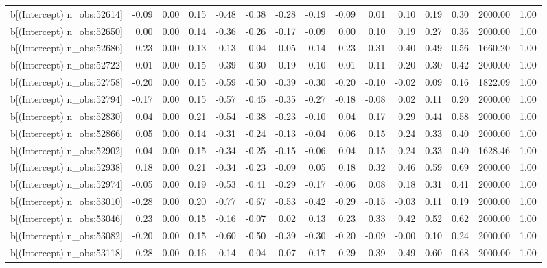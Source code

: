 \begin{table}[ht]
\begin{tabular}{rrrrrrrrrrrrrrr}
  b[(Intercept) n\_obs:52614] & -0.09 & 0.00 & 0.15 & -0.48 & -0.38 & -0.28 & -0.19 & -0.09 & 0.01 & 0.10 & 0.19 & 0.30 & 2000.00 & 1.00 \\ 
  b[(Intercept) n\_obs:52650] & 0.00 & 0.00 & 0.14 & -0.36 & -0.26 & -0.17 & -0.09 & 0.00 & 0.10 & 0.19 & 0.27 & 0.36 & 2000.00 & 1.00 \\ 
  b[(Intercept) n\_obs:52686] & 0.23 & 0.00 & 0.13 & -0.13 & -0.04 & 0.05 & 0.14 & 0.23 & 0.31 & 0.40 & 0.49 & 0.56 & 1660.20 & 1.00 \\ 
  b[(Intercept) n\_obs:52722] & 0.01 & 0.00 & 0.15 & -0.39 & -0.30 & -0.19 & -0.10 & 0.01 & 0.11 & 0.20 & 0.30 & 0.42 & 2000.00 & 1.00 \\ 
  b[(Intercept) n\_obs:52758] & -0.20 & 0.00 & 0.15 & -0.59 & -0.50 & -0.39 & -0.30 & -0.20 & -0.10 & -0.02 & 0.09 & 0.16 & 1822.09 & 1.00 \\ 
  b[(Intercept) n\_obs:52794] & -0.17 & 0.00 & 0.15 & -0.57 & -0.45 & -0.35 & -0.27 & -0.18 & -0.08 & 0.02 & 0.11 & 0.20 & 2000.00 & 1.00 \\ 
  b[(Intercept) n\_obs:52830] & 0.04 & 0.00 & 0.21 & -0.54 & -0.38 & -0.23 & -0.10 & 0.04 & 0.17 & 0.29 & 0.44 & 0.58 & 2000.00 & 1.00 \\ 
  b[(Intercept) n\_obs:52866] & 0.05 & 0.00 & 0.14 & -0.31 & -0.24 & -0.13 & -0.04 & 0.06 & 0.15 & 0.24 & 0.33 & 0.40 & 2000.00 & 1.00 \\ 
  b[(Intercept) n\_obs:52902] & 0.04 & 0.00 & 0.15 & -0.34 & -0.25 & -0.15 & -0.06 & 0.04 & 0.15 & 0.24 & 0.33 & 0.40 & 1628.46 & 1.00 \\ 
  b[(Intercept) n\_obs:52938] & 0.18 & 0.00 & 0.21 & -0.34 & -0.23 & -0.09 & 0.05 & 0.18 & 0.32 & 0.46 & 0.59 & 0.69 & 2000.00 & 1.00 \\ 
  b[(Intercept) n\_obs:52974] & -0.05 & 0.00 & 0.19 & -0.53 & -0.41 & -0.29 & -0.17 & -0.06 & 0.08 & 0.18 & 0.31 & 0.41 & 2000.00 & 1.00 \\ 
  b[(Intercept) n\_obs:53010] & -0.28 & 0.00 & 0.20 & -0.77 & -0.67 & -0.53 & -0.42 & -0.29 & -0.15 & -0.03 & 0.11 & 0.19 & 2000.00 & 1.00 \\ 
  b[(Intercept) n\_obs:53046] & 0.23 & 0.00 & 0.15 & -0.16 & -0.07 & 0.02 & 0.13 & 0.23 & 0.33 & 0.42 & 0.52 & 0.62 & 2000.00 & 1.00 \\ 
  b[(Intercept) n\_obs:53082] & -0.20 & 0.00 & 0.15 & -0.60 & -0.50 & -0.39 & -0.30 & -0.20 & -0.09 & -0.00 & 0.10 & 0.24 & 2000.00 & 1.00 \\ 
  b[(Intercept) n\_obs:53118] & 0.28 & 0.00 & 0.16 & -0.14 & -0.04 & 0.07 & 0.17 & 0.29 & 0.39 & 0.49 & 0.60 & 0.68 & 2000.00 & 1.00 \\ 

\end{tabular}
\end{table}
